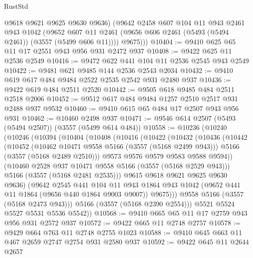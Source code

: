 \begin{lexlean}{RustStd}
\begin{coremodule}
          @9618
          @9621
          @9625
          @9630
          @9636)
        (@9642
          @2458
          @607
          @104
          @11
          @943
          @2461
          @943
          @1042
          (@9652 @607 @11 @2461 (@9656 @606 @2461 (@5493 (@5494 @2461)) (@3557 (@5499 @606 @11))))
          @9675)))
@10404 := @9410 @625 @65 @11 @17 @2551 @943 @956 @931 @2472 @937
@10408 := @9422 @625 @11 @2536 @2549
@10416 := @9472 @622 @441 @104 @11 @2536 @2545 @943 @2549
@10422 := @9481 @621 @9485 @144 @2536 @2543 @2034
@10432 := @9410 @619 @617 @484 @9484 @2522 @2535 @2542 @931 @2480 @937
@10436 := @9422 @619 @484 @2511 @2520
@10442 := @9505 @618 @9485 @484 @2511 @2518 @2006
@10452 := @9512 @617 @484 @9484 @1257 @2510 @2517 @931 @2488 @937 @9532
@10460 := @9410 @615 @65 @484 @17 @2507 @943 @956 @931
@10462 := @10460 @2498 @937
@10471 := @9546 @614 @2507 (@5493 (@5494 @2507)) (@3557 (@5499 @614 @484))
@10558 := @10236
    (@10240
      (@10246
        (@10394
          (@10404
            (@10408
              (@10416
                (@10422
                  (@10432
                    (@10436
                      (@10442
                        (@10452
                          (@10462 @10471 @9558 @5166 (@3557 (@5168 @2499 @943)))
                          @5166
                          (@3557 (@5168 @2489 @2510)))
                        @9573
                        @9576
                        @9579
                        @9583
                        @9588
                        @9594))
                    (@10460 @2528 @937 @10471 @9558 @5166 (@3557 (@5168 @2529 @943)))
                    @5166
                    (@3557 (@5168 @2481 @2535)))
                  @9615
                  @9618
                  @9621
                  @9625
                  @9630
                  @9636)
                (@9642
                  @2545
                  @441
                  @104
                  @11
                  @943
                  @1864
                  @943
                  @1042
                  (@9652 @441 @11 @1864 (@9656 @440 @1864 @9003 @9007))
                  @9675)))
            @9558
            @5166
            (@3557 (@5168 @2473 @943)))
          @5166
          (@3557 (@5168 @2390 @2554)))
        @5521
        @5524
        @5527
        @5531
        @5536
        @5542))
@10568 := @9410 @665 @65 @11 @17 @2759 @943 @956 @931 @2572 @937
@10572 := @9422 @665 @11 @2748 @2757
@10578 := @9429 @664 @763 @11 @2748 @2755 @1023
@10588 := @9410 @645 @663 @11 @467 @2659 @2747 @2754 @931 @2580 @937
@10592 := @9422 @645 @11 @2644 @2657

\end{coremodule}
\end{lexlean}
